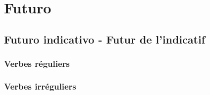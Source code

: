 \chapter{Futuro}
\newpage
\section{Futuro indicativo - Futur de l'indicatif}
\subsection{Verbes réguliers}
\subsection{Verbes irréguliers}